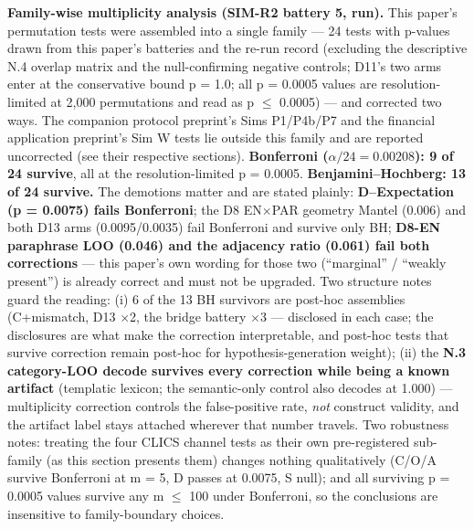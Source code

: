 \documentclass[
]{article}
\begin{document}
\textbf{Family-wise multiplicity analysis (SIM-R2 battery 5, run).} This
paper's permutation tests were assembled into a single family --- 24
tests with p-values drawn from this paper's batteries and the re-run
record (excluding the descriptive N.4 overlap matrix and the
null-confirming negative controls; D11's two arms enter at the
conservative bound p = 1.0; all p = 0.0005 values are resolution-limited
at 2,000 permutations and read as p \(\leq\) 0.0005) --- and corrected
two ways. The companion protocol preprint's Sims P1/P4b/P7 and the
financial application preprint's Sim W tests lie outside this family and
are reported uncorrected (see their respective sections).
\textbf{Bonferroni (\(\alpha/24 = 0.00208\)): 9 of 24 survive}, all at
the resolution-limited p = 0.0005. \textbf{Benjamini--Hochberg: 13 of 24
survive.} The demotions matter and are stated plainly:
\textbf{D--Expectation (p = 0.0075) fails Bonferroni}; the D8
EN\(\times\)PAR geometry Mantel (0.006) and both D13 arms
(0.0095/0.0035) fail Bonferroni and survive only BH; \textbf{D8-EN
paraphrase LOO (0.046) and the adjacency ratio (0.061) fail both
corrections} --- this paper's own wording for those two (``marginal'' /
``weakly present'') is already correct and must not be upgraded. Two
structure notes guard the reading: (i) 6 of the 13 BH survivors are
post-hoc assemblies (C+mismatch, D13 \(\times\)2, the bridge battery
\(\times\)3 --- disclosed in each case; the disclosures are what make
the correction interpretable, and post-hoc tests that survive correction
remain post-hoc for hypothesis-generation weight); (ii) the \textbf{N.3
category-LOO decode survives every correction while being a known
artifact} (templatic lexicon; the semantic-only control also decodes at
1.000) --- multiplicity correction controls the false-positive rate,
\emph{not} construct validity, and the artifact label stays attached
wherever that number travels. Two robustness notes: treating the four
CLICS channel tests as their own pre-registered sub-family (as this
section presents them) changes nothing qualitatively (C/O/A survive
Bonferroni at m = 5, D passes at 0.0075, S null); and all surviving p =
0.0005 values survive any m \(\leq\) 100 under Bonferroni, so the
conclusions are insensitive to family-boundary choices.
\end{document}
